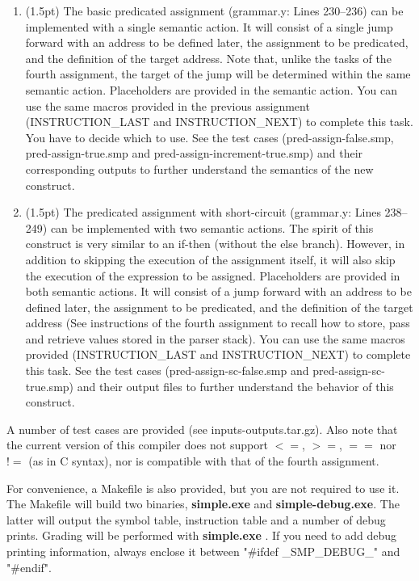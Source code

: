\documentclass[letter,10pt]{article}
\begin{document}
\begin{enumerate}


\item (1.5pt)
The basic predicated assignment (grammar.y: Lines 230--236) can be implemented with a
single semantic action.  It will consist of a single jump forward with an
address to be defined later, the assignment to be predicated, and the
definition of the target address. Note that, unlike the tasks of the fourth
assignment, the target of the jump will be determined within the same semantic
action.  Placeholders are provided in the semantic action.  You can use the
same macros provided in the previous assignment (INSTRUCTION\_LAST and
INSTRUCTION\_NEXT) to complete this task.  You have to decide which to use. See
the test cases (pred-assign-false.smp, pred-assign-true.smp and
pred-assign-increment-true.smp) and their corresponding outputs to further
understand the semantics of the new construct.

\item (1.5pt)
The predicated assignment with short-circuit (grammar.y: Lines 238--249) can be
implemented with two semantic actions.  The spirit of this construct is very
similar to an if-then (without the else branch). However, in addition to
skipping the execution of the assignment itself, it will also skip the
execution of the expression to be assigned.  
Placeholders are provided in both semantic actions.  
It will consist of a jump
forward with an address to be defined later, the assignment to be predicated,
and the definition of the target address (See instructions of the fourth
assignment to recall how to store, pass and retrieve values stored in the
parser stack).  You can use the same macros provided (INSTRUCTION\_LAST and
INSTRUCTION\_NEXT) to complete this task.  See the test cases
(pred-assign-sc-false.smp and  pred-assign-sc-true.smp) and their output
files to further understand the behavior of this construct.


\end{enumerate}

A number of test cases are provided (see inputs-outputs.tar.gz). 
Also note that the current version of this compiler does not support $<=$, $>=$, $==$ nor $!=$ (as in C syntax),
nor is compatible with that of the fourth assignment.

For convenience, a Makefile is also provided, but you are not required to use it.
The Makefile will build two binaries, {\bf simple.exe} and {\bf simple-debug.exe}. The latter will output
the symbol table, instruction table and a number of debug prints. Grading will be performed with
{\bf simple.exe} . If you need to add debug printing information, always enclose it between "\#ifdef \_SMP\_DEBUG\_" and "\#endif".
\end{document}
